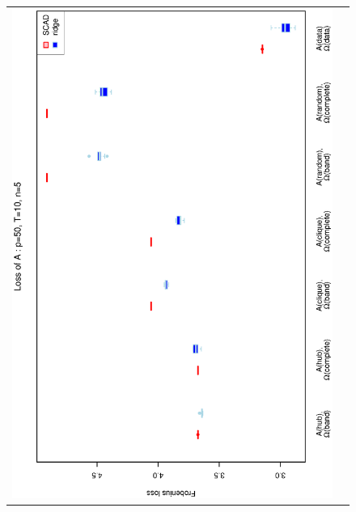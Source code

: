 \begin{figure}[h!]
\centering
\begin{tabular}{cc}
\includegraphics[scale=0.45,angle=270]{LossA50T10N5_5.eps}\\

\end{tabular}
\end{figure}
